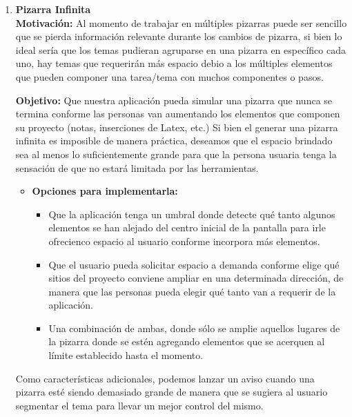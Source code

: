 \documentclass[a4paper, oneside, final]{scrartcl}
\begin{document}
\begin{enumerate}
\item \textbf{Pizarra Infinita}\\ %
  \textbf{Motivación:} Al momento de trabajar en múltiples pizarras puede ser sencillo que se pierda información relevante durante los cambios de pizarra, si bien lo ideal sería que los temas pudieran agruparse en una pizarra en específico cada uno, hay temas que requerirán más espacio debio a los múltiples elementos que pueden componer una tarea/tema con muchos componentes o pasos.

  \textbf{Objetivo:} Que nuestra aplicación pueda simular una pizarra que nunca se termina conforme las personas van aumentando los elementos que componen su proyecto (notas, inserciones de Latex, etc.) Si bien el generar una pizarra infinita es imposible de manera práctica, deseamos que el espacio brindado sea al menos lo suficientemente grande para que la persona usuaria tenga la sensación de que no estará limitada por las herramientas.

  \begin{itemize}
  \item \textbf{Opciones para implementarla:}

    \begin{itemize}
    \item Que la aplicación tenga un umbral donde detecte qué tanto algunos elementos se han alejado del centro inicial de la pantalla para irle ofrecienco espacio al usuario conforme incorpora más elementos.

    \item Que el usuario pueda solicitar espacio a demanda conforme elige qué sitios del proyecto conviene ampliar en una determinada dirección, de manera que las personas pueda elegir qué tanto van a requerir de la aplicación.

    \item Una combinación de ambas, donde sólo se amplie aquellos lugares de la pizarra donde se estén agregando elementos que se acerquen al límite establecido hasta el momento.
    \end{itemize}
  \end{itemize}

  Como características adicionales, podemos lanzar un aviso cuando una pizarra esté siendo demasiado grande de manera que se sugiera al usuario segmentar el tema para llevar un mejor control del mismo.


\end{enumerate}
\end{document}
